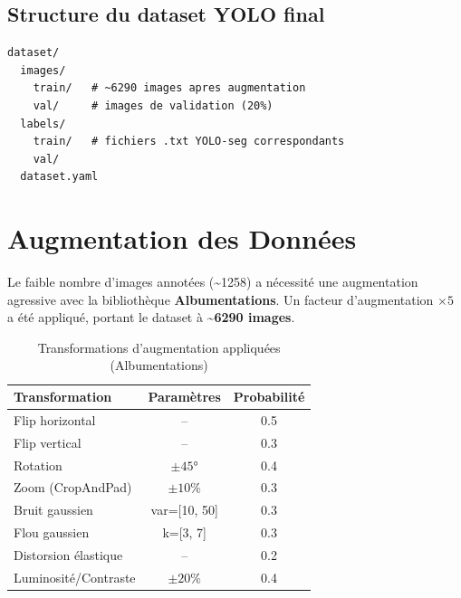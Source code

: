 \documentclass[12pt, a4paper]{report}
\begin{document}
\subsection{Structure du dataset YOLO final}

\begin{lstlisting}[caption=Arborescence du dataset YOLO construit]
dataset/
  images/
    train/   # ~6290 images apres augmentation
    val/     # images de validation (20%)
  labels/
    train/   # fichiers .txt YOLO-seg correspondants
    val/
  dataset.yaml
\end{lstlisting}

\section{Augmentation des Données}

Le faible nombre d'images annotées (\textasciitilde1258) a nécessité une augmentation agressive avec la bibliothèque \textbf{Albumentations}. Un facteur d'augmentation $\times 5$ a été appliqué, portant le dataset à \textbf{\textasciitilde6290 images}.

\begin{table}[H]
  \centering
  \caption{Transformations d'augmentation appliquées (Albumentations)}
  \label{tab:augmentation}
  \begin{tabular}{lcc}
    \toprule
    \rowcolor{themebluevlight}
    \textbf{Transformation} & \textbf{Paramètres} & \textbf{Probabilité} \\
    \midrule
    Flip horizontal      & --            & 0.5 \\
    Flip vertical        & --            & 0.3 \\
    Rotation             & $\pm 45°$     & 0.4 \\
    Zoom (CropAndPad)    & $\pm 10\%$    & 0.3 \\
    Bruit gaussien       & var=[10, 50]  & 0.3 \\
    Flou gaussien        & k=[3, 7]      & 0.3 \\
    Distorsion élastique & --            & 0.2 \\
    Luminosité/Contraste & $\pm 20\%$   & 0.4 \\
    \bottomrule
  \end{tabular}
\end{table}

\newpage

\end{document}
